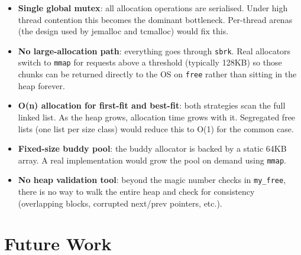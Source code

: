 \documentclass[12pt, a4paper]{report}
\begin{document}
\begin{itemize}
  \item \textbf{Single global mutex}: all allocation operations are serialised.
    Under high thread contention this becomes the dominant bottleneck. Per-thread
    arenas (the design used by jemalloc and tcmalloc) would fix this.

  \item \textbf{No large-allocation path}: everything goes through \texttt{sbrk}.
    Real allocators switch to \texttt{mmap} for requests above a threshold
    (typically 128KB) so those chunks can be returned directly to the OS on
    \texttt{free} rather than sitting in the heap forever.

  \item \textbf{O(n) allocation for first-fit and best-fit}: both strategies
    scan the full linked list. As the heap grows, allocation time grows with it.
    Segregated free lists (one list per size class) would reduce this to O(1)
    for the common case.

  \item \textbf{Fixed-size buddy pool}: the buddy allocator is backed by a
    static 64KB array. A real implementation would grow the pool on demand using
    \texttt{mmap}.

  \item \textbf{No heap validation tool}: beyond the magic number checks in
    \texttt{my\_free}, there is no way to walk the entire heap and check for
    consistency (overlapping blocks, corrupted next/prev pointers, etc.).
\end{itemize}

\section{Future Work}
\end{document}
